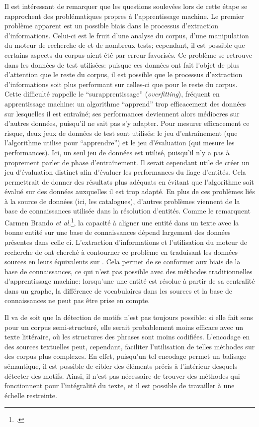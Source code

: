 Il est intéressant de remarquer que les questions soulevées lors de cette étape se rapprochent des problématiques propres à l'apprentissage machine. Le premier problème apparent est un possible biais dans le processus d'extraction d'informations. Celui-ci est le fruit d'une analyse du corpus, d'une manipulation du moteur de recherche de \wkd{} et de nombreux tests; cependant, il est possible que certains aspects du corpus aient été par erreur favorisés. Ce problème se retrouve dans les données de test utilisées: puisque ces données ont fait l'objet de plus d'attention que le reste du corpus, il est possible que le processus d'extraction d'informations soit plus performant sur celles-ci que pour le reste du corpus. Cette difficulté rappelle le \enquote{surapprentissage} (\textit{overfitting}), fréquent en apprentissage machine: un algorithme \enquote{apprend} trop efficacement des données sur lesquelles il est entraîné; ses performances deviennent alors médiocres sur d'autres données, puisqu'il ne sait pas s'y adapter. Pour mesurer efficacement ce risque, deux jeux de données de test sont utilisés: le jeu d'entraînement (que l'algorithme utilise pour \enquote{apprendre}) et le jeu d'évaluation (qui mesure les performances). Ici, un seul jeu de données est utilisé, puisqu'il n'y a pas à proprement parler de phase d'entraînement. Il serait cependant utile de créer un jeu d'évaluation distinct afin d'évaluer les performances du liage d'entités. Cela permettrait de donner des résultats plus adéquats en évitant que l'algorithme soit évalué sur des données auxquelles il est trop adapté. En plus de ces problèmes liés à la source de données (ici, les catalogues), d'autres problèmes viennent de la base de connaissances utilisée dans la résolution d'entités. Comme le remarquent Carmen Brando \textit{et al.}\footcite[p. 37-8]{brando_evaluation_2016}, la capacité à aligner une entité dans un texte avec la bonne entité sur une base de connaissances dépend largement des données présentes dans celle ci. L'extraction d'informations et l'utilisation du moteur de recherche de \wkd{} ont cherché à contourner ce problème en traduisant les données sources en leurs équivalents sur \wkd{}. Cela permet de se conformer aux biais de la base de connaissances, ce qui n'est pas possible avec des méthodes traditionnelles d'apprentissage machine: lorsqu'une une entité est résolue à partir de sa centralité dans un graphe, la différence de vocabulaires dans les sources et la base de connaissances ne peut pas être prise en compte.

Il va de soit que la détection de motifs n'est pas toujours possible: si elle fait sens pour un corpus semi-structuré, elle serait probablement moins efficace avec un texte littéraire, où les structures des phrases sont moins codifiées. L'encodage en \tei{} des sources textuelles peut, cependant, faciliter l'utilisation de telles méthodes sur des corpus plus complexes. En effet, puisqu'un tel encodage permet un balisage sémantique, il est possible de cibler des éléments précis à l'intérieur desquels détecter des motifs. Ainsi, il n'est pas nécessaire de trouver des méthodes qui fonctionnent pour l'intégralité du texte, et il est possible de travailler à une échelle restreinte.

